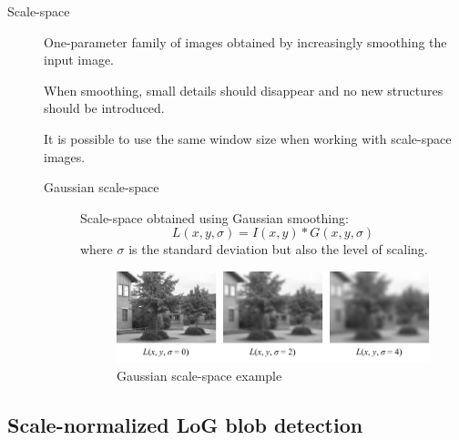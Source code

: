 \begin{description}
    \item[Scale-space] 
        One-parameter family of images obtained by increasingly smoothing the input image.

        \begin{remark}
            When smoothing, small details should disappear and no new structures should be introduced.            
        \end{remark}

        \begin{remark}
            It is possible to use the same window size when working with scale-space images.
        \end{remark}

        \begin{description}
            \item[Gaussian scale-space] 
                Scale-space obtained using Gaussian smoothing:
                \[ L(x, y, \sigma) = I(x, y) * G(x, y, \sigma) \]
                where $\sigma$ is the standard deviation but also the level of scaling.

                \begin{figure}[H]
                    \centering
                    \includegraphics[width=0.8\linewidth]{./img/_scale_space_example.pdf}
                    \caption{Gaussian scale-space example}
                \end{figure}
        \end{description}
\end{description}


\subsection{Scale-normalized LoG blob detection}

